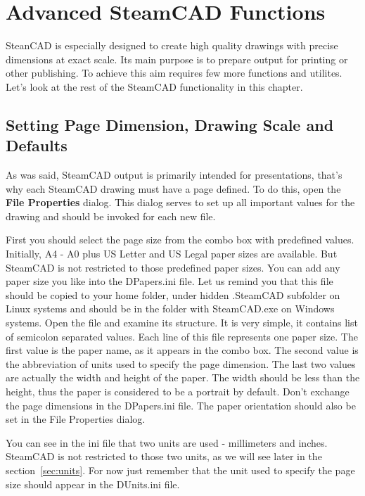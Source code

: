 \chapter{Advanced SteamCAD Functions}\label{chap:chap3}

SteanCAD is especially designed to create high quality drawings with precise
dimensions at exact scale. Its main purpose is to prepare output for printing
or other publishing. To achieve this aim requires few more functions and
utilites. Let's look at the rest of the SteamCAD functionality in this
chapter.

\section{Setting Page Dimension, Drawing Scale and Defaults}\label{sec:settings}

As was said, SteamCAD output is primarily intended for presentations, that's why
each SteamCAD drawing must have a page defined. To do this, open the \textbf{File \lar{}
Properties} dialog. This dialog serves to set up all important values for the drawing
and should be invoked for each new file.

First you should select the page size from the combo box with predefined values.
Initially, A4 - A0 plus US Letter and US Legal paper sizes are available. But SteamCAD
is not restricted to those predefined paper sizes. You can add any paper size you
like into the DPapers.ini file. Let us remind you that this file should be copied
to your home folder, under hidden .SteamCAD subfolder on Linux systems and should
be in the folder with SteamCAD.exe on Windows systems. Open the file and examine its
structure. It is very simple, it contains list of semicolon separated values. Each
line of this file represents one paper size. The first value is the paper name, as
it appears in the combo box. The second value is the abbreviation of units used to
specify the page dimension. The last two values are actually the width and height
of the paper. The width should be less than the height, thus the paper is considered
to be a portrait by default. Don't exchange the page dimensions in the DPapers.ini
file. The paper orientation should also be set in the File Properties dialog.

You can see in the ini file that two units are used - millimeters and inches.
SteamCAD is not restricted to those two units, as we will see later in the
section~\ref{sec:units}. For now just remember that the unit used to specify the
page size should appear in the DUnits.ini file.

